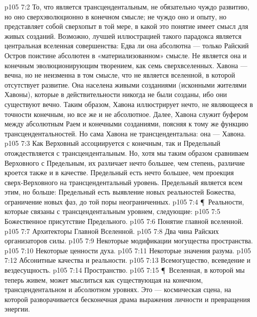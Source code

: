\vs p105 7:2 То, что является трансцендентальным, не обязательно чуждо развитию, но оно сверхэволюционно в конечном смысле; не чуждо оно и опыту, но представляет собой сверхопыт в той мере, в какой это понятие имеет смысл для живых созданий. Возможно, лучшей иллюстрацией такого парадокса является центральная вселенная совершенства: Едва ли она абсолютна --- только Райский Остров поистине абсолютен в «материализованном» смысле. Не является она и конечным эволюционирующим творением, как семь сверхвселенных. Хавона --- вечна, но не неизменна в том смысле, что не является вселенной, в которой отсутствует развитие. Она населена живыми созданиями (исконными жителями Хавоны), которые в действительности никогда не были созданы, ибо они существуют вечно. Таким образом, Хавона иллюстрирует нечто, не являющееся в точности конечным, но все же и не абсолютное. Далее, Хавона служит буфером между абсолютным Раем и конечными созданиями, поясняя к тому же функцию трансцендентальностей. Но сама Хавона не трансцендентальна: она --- Хавона.
\vs p105 7:3 Как Верховный ассоциируется с конечным, так и Предельный отождествляется с трансцендентальным. Но, хотя мы таким образом сравниваем Верховного с Предельным, их различает нечто большее, чем степень, различие кроется также и в качестве. Предельный есть нечто большее, чем проекция сверх\hyp{}Верховного на трансцендентальный уровень. Предельный является всем этим, но больше: Предельный есть выявление новых реальностей Божества, ограничение новых фаз, до той поры неограниченных.
\vs p105 7:4 \P\ Реальности, которые связаны с трансцендентальным уровнем, следующие:
\vs p105 7:5 \bibnobreakspace Божественное присутствие Предельного.
\vs p105 7:6 \bibnobreakspace Понятие главной вселенной.
\vs p105 7:7 \bibnobreakspace Архитекторы Главной Вселенной.
\vs p105 7:8 \bibnobreakspace Два чина Райских организаторов силы.
\vs p105 7:9 \bibnobreakspace Некоторые модификации могущества пространства.
\vs p105 7:10 \bibnobreakspace Некоторые ценности духа.
\vs p105 7:11 \bibnobreakspace Некоторые значения разума.
\vs p105 7:12 \bibnobreakspace Абсонитные качества и реальности.
\vs p105 7:13 \bibnobreakspace Всемогущество, всеведение и вездесущность.
\vs p105 7:14 \bibnobreakspace Пространство.
\vs p105 7:15 \P\ Вселенная, в которой мы теперь живем, может мыслиться как существующая на конечном, трансцендентальном и абсолютном уровнях. Это --- космическая сцена, на которой разворачивается бесконечная драма выражения личности и превращения энергии.
